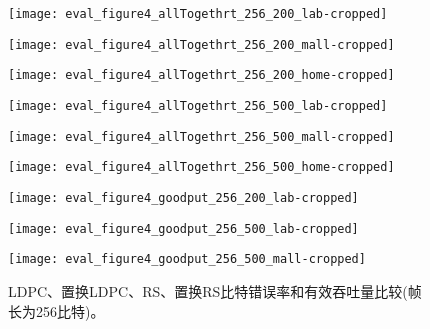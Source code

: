 \begin{figure}[t]
	\begin{minipage}[b]{.32\linewidth}
		\texttt{[image: eval\_figure4\_allTogethrt\_256\_200\_lab-cropped]}
		\label{fig:ber_200_lab}
	\end{minipage}
	\hfill
	\begin{minipage}[b]{.32\linewidth}
		\texttt{[image: eval\_figure4\_allTogethrt\_256\_200\_mall-cropped]}
		\label{fig:ber_200_mall}
	\end{minipage}
	\hfill
	\begin{minipage}[b]{.32\linewidth}
		\texttt{[image: eval\_figure4\_allTogethrt\_256\_200\_home-cropped]}
		\label{fig:ber_200_home}
	\end{minipage}
	
	\begin{minipage}[b]{.32\linewidth}
		\texttt{[image: eval\_figure4\_allTogethrt\_256\_500\_lab-cropped]}
		\label{fig:ber_500_lab}
	\end{minipage}
	\hfill
	\begin{minipage}[b]{.32\linewidth}
		\texttt{[image: eval\_figure4\_allTogethrt\_256\_500\_mall-cropped]}
		\label{fig:ber_500_mall}
	\end{minipage}
	\hfill
	\begin{minipage}[b]{.32\linewidth}
		\texttt{[image: eval\_figure4\_allTogethrt\_256\_500\_home-cropped]}
		\label{fig:ber_500_home}
	\end{minipage}
	
	\begin{minipage}[b]{.32\linewidth}
		\texttt{[image: eval\_figure4\_goodput\_256\_200\_lab-cropped]}
		\label{fig:goodput_200_lab}
	\end{minipage}
	\hfill
	\begin{minipage}[b]{.32\linewidth}
		\texttt{[image: eval\_figure4\_goodput\_256\_500\_lab-cropped]}
		\label{fig:goodput_500_lab}
	\end{minipage}
	\hfill
	\begin{minipage}[b]{.32\linewidth}
		\texttt{[image: eval\_figure4\_goodput\_256\_500\_mall-cropped]}
		\label{fig:goodput_500_mall}
	\end{minipage}
	
	\caption{LDPC、置换LDPC、RS、置换RS比特错误率和有效吞吐量比较(帧长为256比特)。}\label{fig:ber}
\end{figure}
